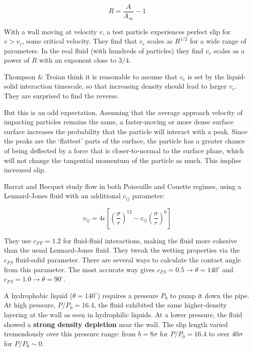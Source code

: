 \documentclass[12pt, a4paper, twoside, openright]{book}
\begin{document}
\begin{equation}
R = \frac{A}{A_{\infty}} - 1
\end{equation}

With a wall moving at velocity $v$, a test particle experiences perfect slip for $v>v_{c}$, some critical velocity. They find that $v_{c}$ scales as $R^{1/2}$ for a wide range of parameters. In the real fluid (with hundreds of particles) they find $v_{c}$ scales as a power of $R$ with an exponent close to $3/4$.

Thompson \& Troian think it is reasonable to assume that $v_{c}$ is set by the liquid-solid interaction timescale, so that increasing density should lead to larger $v_{c}$.  They are surprised to find the reverse.

But this is an odd expectation.  Assuming that the average approach velocity of impacting particles remains the same, a faster-moving or more dense surface surface increases the probability that the particle will interact with a peak.  Since the peaks are the `flattest' parts of the surface, the particle has a greater chance of being deflected by a force that is closer-to-normal to the surface plane, which will not change the tangential momentum of the particle as much.  This implies increased slip.
\vspace*{1em}

Barrat and Bocquet \cite{BarratBocquet1999} study flow in both Poiseuille and  Couette regimes, using a Lennard-Jones fluid with an additional $c_{ij}$ parameter:

\begin{equation}
v_{ij} = 4 \epsilon \left[ \left( \frac{\sigma}{r}\right)^{12}
 - c_{ij} \left( \frac{\sigma}{r} \right)^{6} \right]
\end{equation}


They use $c_{FF} = 1.2$ for fluid-fluid interactions, making the fluid more cohesive than the usual Lennard-Jones fluid. They tweak the wetting properties via the $c_{FS}$ fluid-solid parameter.  There are several ways to calculate the contact angle from this parameter.  The most accurate way gives $c_{FS}=0.5 \rightarrow \theta= 140^{\circ}$ and $c_{FS} = 1.0 \rightarrow \theta = 90^{\circ}$.

A hydrophobic liquid ($\theta = 140^{\circ}$) requires a pressure $P_{0}$ to pump it down the pipe. %
 At high pressure, $P/P_{0}=16.4$, the fluid exhibited the same higher-density layering at the wall as seen in hydrophilic liquids.  At a lower pressure, %
  the fluid showed a \textbf{strong density depletion} near the wall.  The slip length varied tremendously over this pressure range: from $b = 8\sigma$ for $P/P_{0} = 16.4$ to over $40\sigma$ for $P/P_{0} \sim 0$.
\end{document}
